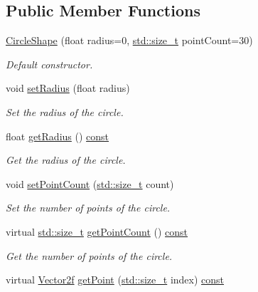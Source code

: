 \subsection*{Public Member Functions}
\begin{DoxyCompactItemize}
\item 
\hyperlink{classsf_1_1_circle_shape_aaebe705e7180cd55588eb19488af3af1}{Circle\-Shape} (float radius=0, \hyperlink{nc__alloc_8h_a7b60c5629e55e8ec87a4547dd4abced4}{std\-::size\-\_\-t} point\-Count=30)
\begin{DoxyCompactList}\small\item\em Default constructor. \end{DoxyCompactList}\item 
void \hyperlink{classsf_1_1_circle_shape_a21cdf85fc2f201e10222a241af864be0}{set\-Radius} (float radius)
\begin{DoxyCompactList}\small\item\em Set the radius of the circle. \end{DoxyCompactList}\item 
float \hyperlink{classsf_1_1_circle_shape_afaf5175a75b6179cc177b1281027ab00}{get\-Radius} () \hyperlink{term__entry_8h_a57bd63ce7f9a353488880e3de6692d5a}{const} 
\begin{DoxyCompactList}\small\item\em Get the radius of the circle. \end{DoxyCompactList}\item 
void \hyperlink{classsf_1_1_circle_shape_a16590ee7bdf5c9f752275468a4997bed}{set\-Point\-Count} (\hyperlink{nc__alloc_8h_a7b60c5629e55e8ec87a4547dd4abced4}{std\-::size\-\_\-t} count)
\begin{DoxyCompactList}\small\item\em Set the number of points of the circle. \end{DoxyCompactList}\item 
virtual \hyperlink{nc__alloc_8h_a7b60c5629e55e8ec87a4547dd4abced4}{std\-::size\-\_\-t} \hyperlink{classsf_1_1_circle_shape_aba76ceafb7a714f02c85bc5ea491eaf3}{get\-Point\-Count} () \hyperlink{term__entry_8h_a57bd63ce7f9a353488880e3de6692d5a}{const} 
\begin{DoxyCompactList}\small\item\em Get the number of points of the circle. \end{DoxyCompactList}\item 
virtual \hyperlink{namespacesf_a80cea3c46537294fd1d8d428566ad8b2}{Vector2f} \hyperlink{classsf_1_1_circle_shape_ac7452005d91cefd5c6805281a8fbc1b3}{get\-Point} (\hyperlink{nc__alloc_8h_a7b60c5629e55e8ec87a4547dd4abced4}{std\-::size\-\_\-t} index) \hyperlink{term__entry_8h_a57bd63ce7f9a353488880e3de6692d5a}{const} 

\end{DoxyCompactItemize}
